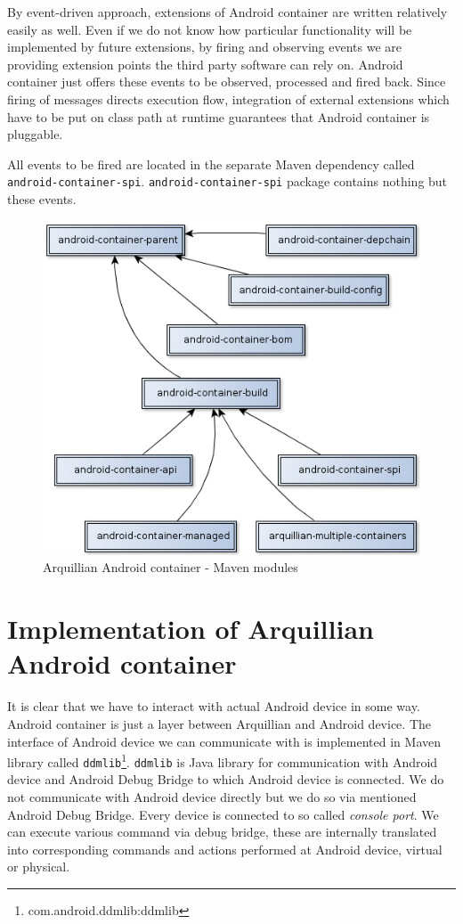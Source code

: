 \documentclass[12pt,final,oneside]{fithesis}
\begin{document}
By event-driven approach, extensions of Android container are written relatively easily as well. Even if we do not know how particular functionality will be implemented by future extensions, by firing and observing events we are providing extension points the third party software can rely on. Android container just offers these events to be observed, processed and fired back. Since firing of messages directs execution flow, integration of external extensions which have to be put on class path at runtime guarantees that Android container is pluggable.

All events to be fired are located in the separate Maven dependency called \texttt{android-container-spi}. \texttt{android-container-spi} package contains nothing but these events.

\begin{figure}[h!tb]
	\centering
	\includegraphics[width=.8\textwidth]{resources/android-container-modules.png}
	\caption{Arquillian Android container - Maven modules}
	\label{fig:android_container_maven_modules}
\end{figure}

\chapter{Implementation of Arquillian Android container}

It is clear that we have to interact with actual Android device in some way. Android container is just a layer between Arquillian and Android device. The interface of Android device we can communicate with is implemented in Maven library called \texttt{ddmlib}\footnote{com.android.ddmlib:ddmlib}. \texttt{ddmlib} is Java library for communication with Android device and Android Debug Bridge to which Android device is connected. We do not communicate with Android device directly but we do so via mentioned Android Debug Bridge. Every device is connected to so called \textit{console port}. We can execute various command via debug bridge, these are internally translated into corresponding commands and actions performed at Android device, virtual or physical.
\end{document}

